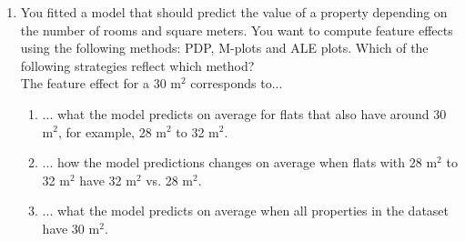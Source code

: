 \documentclass[a4paper]{article}
\begin{document}
{\begin{enumerate}
    \item You fitted a model that should predict the value of a property depending on 
    the number of rooms and square meters. 
    You want to compute feature effects using the following methods: 
    PDP, M-plots and ALE plots. 
    Which of the following strategies reflect which method? \\
    The feature effect for a 30 m$^2$ corresponds to... 
\begin{enumerate}
  \item ... what the model predicts on average for flats that also have around 30 m$^2$, for example, 28 m$^2$ to 32 m$^2$. 
  \item ... how the model predictions changes on average when flats with 28 m$^2$ to 32 m$^2$ have 32 m$^2$ vs. 28 m$^2$. 
  \item ... what the model predicts on average when all properties in the dataset have 30 m$^2$. 
\end{enumerate}
\end{enumerate}
}

\dlz

\end{document}
